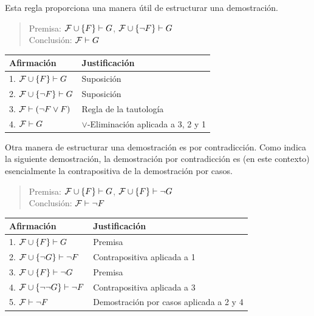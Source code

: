 \documentclass[12pt,a4paper]{book}
\makeatletter
\newenvironment{derivacion}{%
  \begingroup
  \renewcommand{\arraystretch}{1.35}
  \begin{center}
  \begin{tabular}{@{}l l@{}}
    \textbf{Afirmación} & \textbf{Justificación}\\
    \hline
}{%
  \end{tabular}
  \end{center}
  \endgroup
}
\makeatother
\begin{document}
    \begin{ejemplo}\label{ej:demostracion-por-casos}
        Esta regla proporciona una manera útil de estructurar una demostración.

        \begin{quote}
            Premisa: $\mathcal{F}\cup\{F\}\vdash G$, $\mathcal{F}\cup\{\neg F\}\vdash G$\\
            Conclusión: $\mathcal{F}\vdash G$
        \end{quote}

        \begin{derivacion}
            1. $\mathcal{F}\cup\{F\}\vdash G$ & Suposición\\
            2. $\mathcal{F}\cup\{\neg F\}\vdash G$ & Suposición\\
            3. $\mathcal{F}\vdash(\neg F\vee F)$ & Regla de la tautología\\
            4. $\mathcal{F}\vdash G$ & $\vee$-Eliminación aplicada a 3, 2 y 1\\
        \end{derivacion}
    \end{ejemplo}

    \begin{ejemplo}\label{ej:demostracion-por-contradiccion}
        Otra manera de estructurar una demostración es por contradicción. Como indica la siguiente demostración, la demostración
        por contradicción es (en este contexto) esencialmente la contrapositiva de la demostración por casos.

        \begin{quote}
            Premisa: $\mathcal{F}\cup\{F\}\vdash G$, $\mathcal{F}\cup\{F\}\vdash\neg G$\\
            Conclusión: $\mathcal{F}\vdash\neg F$
        \end{quote}

        \begin{derivacion}
            1. $\mathcal{F}\cup\{F\}\vdash G$ & Premisa\\
            2. $\mathcal{F}\cup\{\neg G\}\vdash\neg F$ & Contrapositiva aplicada a 1\\
            3. $\mathcal{F}\cup\{F\}\vdash\neg G$ & Premisa\\
            4. $\mathcal{F}\cup\{\neg\neg G\}\vdash\neg F$ & Contrapositiva aplicada a 3\\
            5. $\mathcal{F}\vdash\neg F$ & Demostración por casos aplicada a 2 y 4\\
        \end{derivacion}
    \end{ejemplo}
\end{document}
